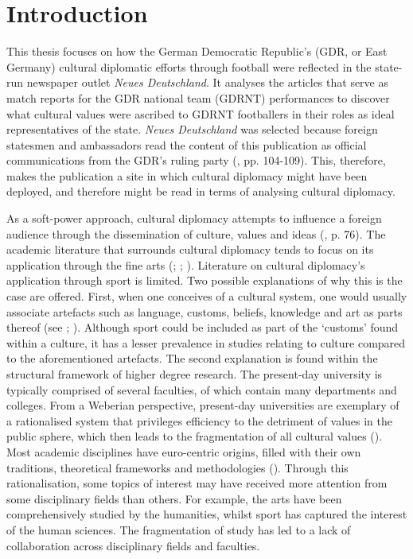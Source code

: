 \chapter*{Introduction}\label{cha:introduction}

This thesis focuses on how the German Democratic Republic’s (GDR, or East Germany) cultural diplomatic efforts through football were reflected in the state-run newspaper outlet \textit{Neues Deutschland}. It analyses the articles that serve as match reports for the GDR national team (GDRNT) performances to discover what cultural values were ascribed to GDRNT footballers in their roles as ideal representatives of the state. \textit{Neues Deutschland} was selected because foreign statesmen and ambassadors read the content of this publication as official communications from the GDR’s ruling party (\cite{fiedler2014}, pp. 104-109). This, therefore, makes the publication a site in which cultural diplomacy might have been deployed, and therefore might be read in terms of analysing cultural diplomacy.

As a soft-power approach, cultural diplomacy attempts to influence a foreign audience through the dissemination of culture, values and ideas (\cite{lenczowski2009}, p. 76). The academic literature that surrounds cultural diplomacy tends to focus on its application through the fine arts (\cite{prevots1998}; \cite{david-fox2011}; \cite{mikkonensuutari2016}). Literature on cultural diplomacy’s application through sport is limited. Two possible explanations of why this is the case are offered. First, when one conceives of a cultural system, one would usually associate artefacts such as language, customs, beliefs, knowledge and art as parts thereof (see \cite{boas1930}; \cite{tylor1958}). Although sport could be included as part of the ‘customs’ found within a culture, it has a lesser prevalence in studies relating to culture compared to the aforementioned artefacts. The second explanation is found within the structural framework of higher degree research. The present-day university is typically comprised of several faculties, of which contain many departments and colleges. From a Weberian perspective, present-day universities are exemplary of a rationalised system that privileges efficiency to the detriment of values in the public sphere, which then leads to the fragmentation of all cultural values (\cite{weber1976}). Most academic disciplines have euro-centric origins, filled with their own traditions, theoretical frameworks and methodologies (\cite{klein1990}). Through this rationalisation, some topics of interest may have received more attention from some disciplinary fields than others. For example, the arts have been comprehensively studied by the humanities, whilst sport has captured the interest of the human sciences. The fragmentation of study has led to a lack of collaboration across disciplinary fields and faculties.

